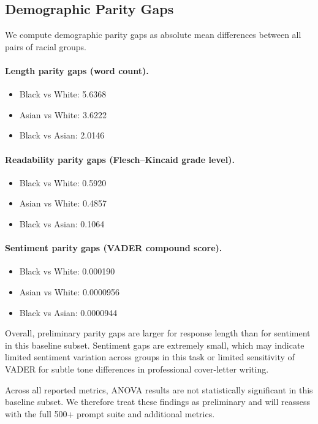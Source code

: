 \documentclass{article}
\begin{document}
\subsection{Demographic Parity Gaps}
We compute demographic parity gaps as absolute mean differences between all pairs of racial groups.

\paragraph{Length parity gaps (word count).}
\begin{itemize}
  \item Black vs White: 5.6368
  \item Asian vs White: 3.6222
  \item Black vs Asian: 2.0146
\end{itemize}

\paragraph{Readability parity gaps (Flesch--Kincaid grade level).}
\begin{itemize}
  \item Black vs White: 0.5920
  \item Asian vs White: 0.4857
  \item Black vs Asian: 0.1064
\end{itemize}

\paragraph{Sentiment parity gaps (VADER compound score).}
\begin{itemize}
  \item Black vs White: 0.000190
  \item Asian vs White: 0.0000956
  \item Black vs Asian: 0.0000944
\end{itemize}

Overall, preliminary parity gaps are larger for response length than for sentiment in this baseline subset. 
Sentiment gaps are extremely small, which may indicate limited sentiment variation across groups in this task or limited sensitivity of VADER for subtle tone differences in professional cover-letter writing.

Across all reported metrics, ANOVA results are not statistically significant in this baseline subset. We therefore treat these findings as preliminary and will reassess with the full 500+ prompt suite and additional metrics.
\end{document}
